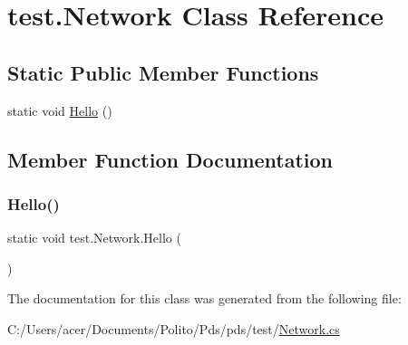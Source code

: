 \hypertarget{classtest_1_1_network}{}\section{test.\+Network Class Reference}
\label{classtest_1_1_network}
\subsection*{Static Public Member Functions}
\begin{DoxyCompactItemize}
\item 
static void \hyperlink{classtest_1_1_network_a8c128f08b5548af4a5a8c10cec3a708c}{Hello} ()
\end{DoxyCompactItemize}


\subsection{Member Function Documentation}
\mbox{\label{classtest_1_1_network_a8c128f08b5548af4a5a8c10cec3a708c}} 
\subsubsection{\texorpdfstring{Hello()}{Hello()}}
{\footnotesize\ttfamily static void test.\+Network.\+Hello (\begin{DoxyParamCaption}{ }\end{DoxyParamCaption})\hspace{0.3cm}{\ttfamily [static]}}



The documentation for this class was generated from the following file\+:\begin{DoxyCompactItemize}
\item 
C\+:/\+Users/acer/\+Documents/\+Polito/\+Pds/pds/test/\hyperlink{_network_8cs}{Network.\+cs}\end{DoxyCompactItemize}
